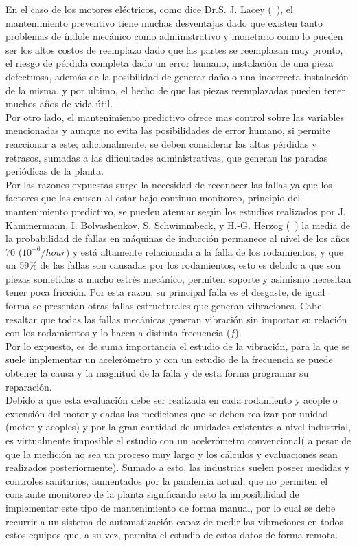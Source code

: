 	En el caso de los motores eléctricos, como dice Dr.S. J. Lacey (~\cite{Lacey}), el mantenimiento preventivo tiene muchas desventajas dado que existen tanto problemas de índole mecánico como administrativo y monetario como lo pueden ser los altos costos de reemplazo dado que las partes se reemplazan muy pronto, el riesgo de pérdida completa dado un error humano, instalación de una pieza defectuosa, además de la posibilidad de generar daño o una incorrecta instalación de la misma, y por ultimo, el hecho de que las piezas reemplazadas pueden tener muchos años de vida útil.\\
	
	Por otro lado, el mantenimiento predictivo ofrece mas control sobre las variables mencionadas y aunque no evita las posibilidades de error humano, si permite reaccionar a este; adicionalmente, se deben considerar las altas pérdidas y retrasos, sumadas a las dificultades administrativas, que generan las paradas periódicas de la planta.\\

	Por las razones expuestas surge la necesidad de reconocer las fallas ya que los factores que las causan al estar bajo continuo monitoreo, principio del mantenimiento predictivo, se pueden atenuar según los estudios realizados por J. Kammermann, I. Bolvashenkov, S. Schwimmbeck, y H.-G. Herzog (~\cite{Kammermann}) la media de la probabilidad de fallas en máquinas de inducción permanece al nivel de los años 70 ($10^{-6}/hour$) y está altamente relacionada a la falla de los rodamientos, y que un 59\% de las fallas son causadas por los rodamientos, esto es debido a que son piezas sometidas a mucho estrés mecánico, permiten soporte y asimismo necesitan tener poca fricción. Por esta razon, su principal falla es el desgaste, de igual forma se presentan otras fallas estructurales que generan vibraciones. Cabe resaltar que todas las fallas mecánicas generan vibración sin importar su relación con los rodamientos y lo hacen a distinta frecuencia ($f$). \\


	Por lo expuesto, es de suma importancia el estudio de la vibración, para la que se suele implementar un acelerómetro y con un estudio de la frecuencia se puede obtener la causa y la magnitud de la falla y de esta forma programar su reparación.\\
	Debido a que esta evaluación debe ser realizada en cada rodamiento y acople o extensión del motor y dadas las mediciones que se deben realizar por unidad (motor y acoples) y por la gran cantidad de unidades existentes a nivel industrial, es virtualmente imposible el estudio con un acelerómetro convencional( a pesar de que la medición no sea un proceso muy largo y los cálculos y evaluaciones sean realizados posteriormente). Sumado a esto, las industrias suelen poseer medidas y controles sanitarios, aumentados por la pandemia actual, que no permiten el constante monitoreo de la planta significando esto la imposibilidad de implementar este tipo de mantenimiento de forma manual, por lo cual se debe recurrir a un sistema de automatización capaz de medir las vibraciones en todos estos equipos que, a su vez, permita el estudio de estos datos de forma remota. \\

	


